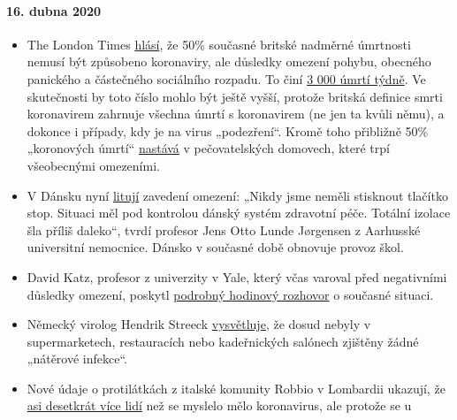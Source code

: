 \hypertarget{16-dubna-2020}{%
\paragraph{16. dubna 2020}\label{16-dubna-2020}}

\begin{itemize}
\tightlist
\item
  The London Times \href{https://archive.is/2eKCW}{hlásí}, že 50\%
  současné britské nadměrné úmrtnosti nemusí být způsobeno koronaviry,
  ale důsledky omezení pohybu, obecného panického a částečného
  sociálního rozpadu. To činí
  \href{https://www.ons.gov.uk/peoplepopulationandcommunity/birthsdeathsandmarriages/deaths/bulletins/deathsregisteredweeklyinenglandandwalesprovisional/weekending3april2020}{3
  000 úmrtí týdně}. Ve skutečnosti by toto číslo mohlo být ještě vyšší,
  protože britská definice smrti koronavirem zahrnuje všechna úmrtí s
  koronavirem (ne jen ta kvůli němu), a dokonce i případy, kdy je na
  virus „podezření``. Kromě toho přibližně 50\% „koronových úmrtí``
  \href{https://ltccovid.org/2020/04/12/mortality-associated-with-covid-19-outbreaks-in-care-homes-early-international-evidence/}{nastává}
  v pečovatelských domovech, které trpí všeobecnými omezeními.
\item
  V Dánsku nyní
  \href{https://jyllands-posten.dk/debat/breve/ECE12074246/vi-skulle-aldrig-have-trykket-paa-stopknappen/}{litují}
  zavedení omezení: „Nikdy jsme neměli stisknout tlačítko stop. Situaci
  měl pod kontrolou dánský systém zdravotní péče. Totální izolace šla
  příliš daleko``, tvrdí profesor Jens Otto Lunde Jørgensen z Aarhusské
  universitní nemocnice. Dánsko v současné době obnovuje provoz škol.
\item
  David Katz, profesor z univerzity v Yale, který včas varoval před
  negativními důsledky omezení, poskytl
  \href{https://www.youtube.com/watch?v=VK0Wtjh3HVA}{podrobný hodinový
  rozhovor} o současné situaci.
\item
  Německý virolog Hendrik Streeck
  \href{https://today.rtl.lu/news/science-and-environment/a/1498185.html}{vysvětluje},
  že dosud nebyly v supermarketech, restauracích nebo kadeřnických
  salónech zjištěny žádné „nátěrové infekce``.
\item
  Nové údaje o protilátkách z italské komunity Robbio v Lombardii
  ukazují, že
  \href{https://www.tgcom24.mediaset.it/cronaca/a-robbio-pv-il-22-ha-o-ha-avuto-il-coronavirus-ok-del-sindaco-ai-test-per-tutti_17285128-202002a.shtml}{asi
  desetkrát více lidí} než se myslelo mělo koronavirus, ale protože se u

\end{itemize}
